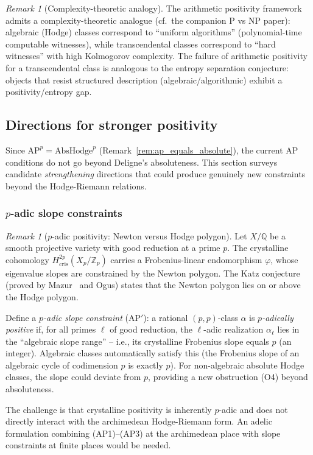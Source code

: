 \documentclass[aps,prd,twocolumn,superscriptaddress,nofootinbib]{revtex4-2}
\theoremstyle{definition}
\theoremstyle{remark}
\newtheorem{remark}[theorem]{Remark}
\begin{document}
\begin{remark}[Complexity-theoretic analogy]
\label{rem:pnp-analogy}
The arithmetic positivity framework admits a complexity-theoretic analogue (cf.\ the companion P vs NP paper): algebraic (Hodge) classes correspond to ``uniform algorithms'' (polynomial-time computable witnesses), while transcendental classes correspond to ``hard witnesses'' with high Kolmogorov complexity. The failure of arithmetic positivity for a transcendental class is analogous to the entropy separation conjecture: objects that resist structured description (algebraic/algorithmic) exhibit a positivity/entropy gap.
\end{remark}


\subsection{Directions for stronger positivity}
\label{sec:stronger_positivity}

Since $\mathrm{AP}^p = \mathrm{AbsHodge}^p$ (Remark~\ref{rem:ap_equals_absolute}), the current AP conditions do not go beyond Deligne's absoluteness. This section surveys candidate \textit{strengthening} directions that could produce genuinely new constraints beyond the Hodge-Riemann relations.

\subsubsection{$p$-adic slope constraints}

\begin{remark}[$p$-adic positivity: Newton versus Hodge polygon]
\label{rem:newton-hodge}
Let $X/\mathbb{Q}$ be a smooth projective variety with good reduction at a prime $p$. The crystalline cohomology $H^{2p}_{\mathrm{cris}}(X_p/\mathbb{Z}_p)$ carries a Frobenius-linear endomorphism $\varphi$, whose eigenvalue slopes are constrained by the Newton polygon. The Katz conjecture (proved by Mazur~\cite{Mazur1972} and Ogus) states that the Newton polygon lies on or above the Hodge polygon.

Define a \textit{$p$-adic slope constraint} (AP$'$): a rational $(p,p)$-class $\alpha$ is \textit{$p$-adically positive} if, for all primes $\ell$ of good reduction, the $\ell$-adic realization $\alpha_\ell$ lies in the ``algebraic slope range'' -- i.e., its crystalline Frobenius slope equals $p$ (an integer). Algebraic classes automatically satisfy this (the Frobenius slope of an algebraic cycle of codimension $p$ is exactly $p$). For non-algebraic absolute Hodge classes, the slope could deviate from $p$, providing a new obstruction (O4) beyond absoluteness.

The challenge is that crystalline positivity is inherently $p$-adic and does not directly interact with the archimedean Hodge-Riemann form. An adelic formulation combining (AP1)--(AP3) at the archimedean place with slope constraints at finite places would be needed.
\end{remark}
\end{document}

